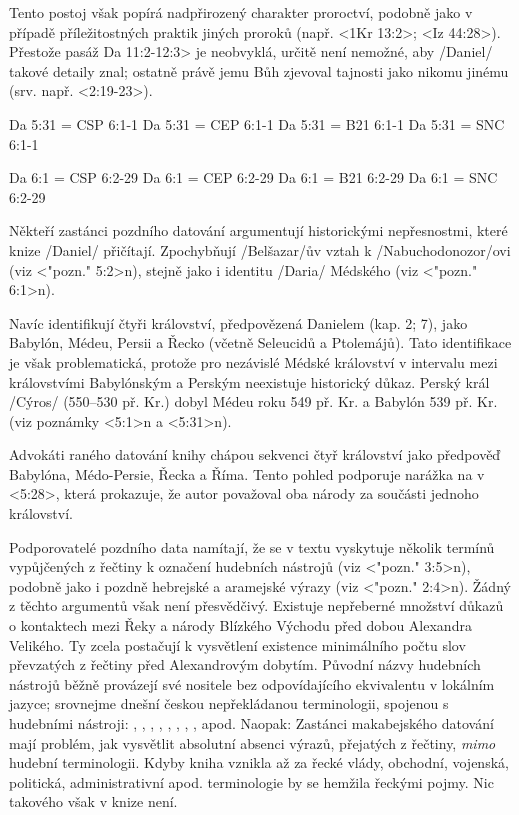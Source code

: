 Tento postoj však popírá nadpřirozený charakter proroctví, podobně jako v případě příležitostných praktik jiných proroků (např. <1Kr 13:2>; <Iz 44:28>). Přestože pasáž  \<Da 11:2-12:3> je neobvyklá, určitě není nemožné, aby \x/Daniel/ takové detaily znal; ostatně právě jemu Bůh zjevoval tajnosti jako nikomu jinému (srv. např. <2:19-23>).  




\renum Da 5:31 = CSP 6:1-1
\renum Da 5:31 = CEP 6:1-1
\renum Da 5:31 = B21 6:1-1
\renum Da 5:31 = SNC 6:1-1 

\renum Da 6:1 = CSP 6:2-29
\renum Da 6:1 = CEP 6:2-29
\renum Da 6:1 = B21 6:2-29
\renum Da 6:1 = SNC 6:2-29


Někteří zastánci pozdního datování argumentují historickými nepřesnostmi, které knize \x/Daniel/ přičítají.
Zpochybňují \x/Belšazar/ův vztah k \x/Nabuchodonozor/ovi (viz <"pozn." 5:2>n), stejně jako i identitu  \x/Daria/ Médského (viz <"pozn." 6:1>n). 

Navíc identifikují čtyři království, předpovězená Danielem (kap. 2; 7), jako Babylón, Médeu, Persii a Řecko (včetně Seleucidů a Ptolemájů). Tato identifikace je však problematická, protože pro nezávislé Médské království v intervalu mezi královstvími Babylónským a Perským neexistuje historický důkaz.
Perský král \x/Cýros/ (550--530 př. Kr.) dobyl Médeu roku 549 př. Kr. a Babylón 539 př. Kr. (viz poznámky <5:1>n a <5:31>n).

Advokáti raného datování knihy chápou sekvenci čtyř království jako předpověď Babylóna, Médo-Persie, Řecka a Říma. 
Tento pohled podporuje narážka na  v <5:28>, která prokazuje, že autor považoval oba národy za součásti jednoho království.

Podporovatelé pozdního data namítají, že se v textu vyskytuje několik termínů vypůjčených z řečtiny k označení hudebních nástrojů (viz <"pozn." 3:5>n), podobně jako i  pozdně hebrejské a aramejské výrazy (viz <"pozn." 2:4>n).
Žádný z těchto argumentů však není přesvědčivý.
Existuje nepřeberné množství důkazů o kontaktech mezi Řeky a národy Blízkého Východu před dobou Alexandra Velikého. Ty zcela postačují k vysvětlení existence minimálního počtu slov převzatých z řečtiny před Alexandrovým dobytím. 
Původní názvy hudebních nástrojů běžně provázejí své nositele bez odpovídajícího ekvivalentu v lokálním jazyce; srovnejme dnešní českou nepřekládanou terminologii, spojenou s hudebními nástroji:  , , , , , , , ,  apod.
Naopak: Zastánci makabejského datování mají problém, jak vysvětlit absolutní absenci výrazů, přejatých z řečtiny, {\it mimo\/} hudební terminologii. Kdyby kniha vznikla až za řecké vlády, obchodní, vojenská, politická, administrativní apod. terminologie  by se hemžila řeckými pojmy. Nic takového však v knize není.

